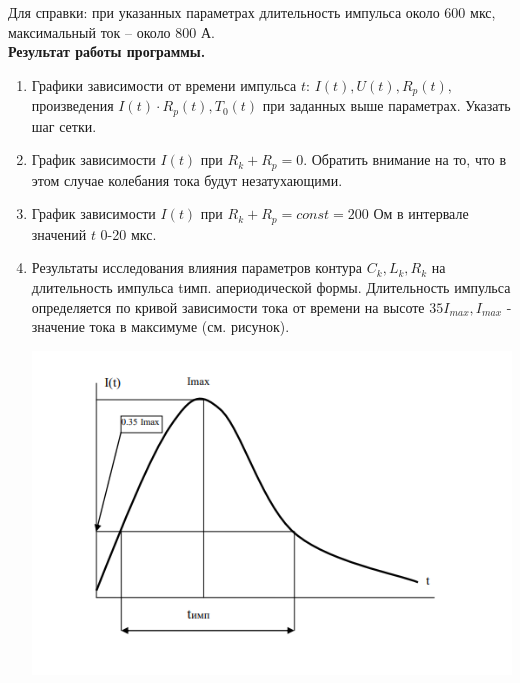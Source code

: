 Для справки: при указанных параметрах длительность импульса около 600 мкс,
максимальный ток – около 800 А.\\

\textbf{Результат работы программы.}
\begin{enumerate}
	\item Графики зависимости от времени импульса $t$: $I(t), U(t), R_p(t),$ произведения $I(t) \cdot R_p(t), T_0(t)$ при заданных выше параметрах.
	Указать шаг сетки.
	
	\item График зависимости $I(t)$ при $R_k + R_p = 0$. Обратить внимание на то, что в этом случае колебания тока будут незатухающими.
	
	\item График зависимости $I(t)$ при $R_k + R_p = const = 200$ Ом в интервале значений $t$ 0-20 мкс.
	
	\item Результаты исследования влияния параметров контура $C_k, L_k, R_k$ на длительность импульса tимп. апериодической формы. Длительность импульса определяется по кривой
	зависимости тока от времени на высоте
	$35 I_{max}, I_{max}$ - значение тока в максимуме (см. рисунок).
	
	\includegraphics{graph}
	
\end{enumerate}